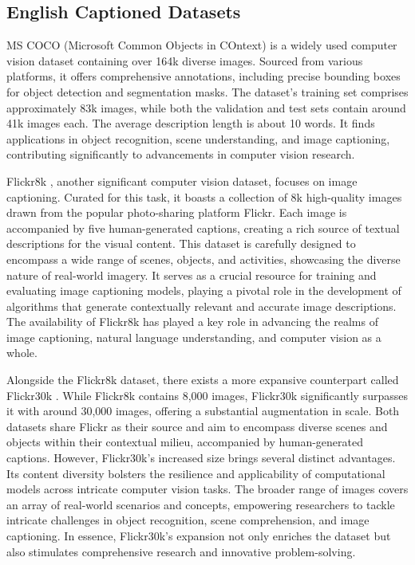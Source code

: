 \documentclass[lettersize,journal]{IEEEtran}
\begin{document}
\enlargethispage{-\baselineskip}

\subsection{English Captioned Datasets}
MS COCO (Microsoft Common Objects in COntext) \cite{MSCOCO} is a widely used computer vision dataset containing over 164k diverse images. Sourced from various platforms, it offers comprehensive annotations, including precise bounding boxes for object detection and segmentation masks. The dataset's training set comprises approximately 83k images, while both the validation and test sets contain around 41k images each. The average description length is about 10 words. It finds applications in object recognition, scene understanding, and image captioning, contributing significantly to advancements in computer vision research. 

Flickr8k \cite{Flickr8k}, another significant computer vision dataset, focuses on image captioning. Curated for this task, it boasts a collection of 8k high-quality images drawn from the popular photo-sharing platform Flickr. Each image is accompanied by five human-generated captions, creating a rich source of textual descriptions for the visual content. This dataset is carefully designed to encompass a wide range of scenes, objects, and activities, showcasing the diverse nature of real-world imagery. It serves as a crucial resource for training and evaluating image captioning models, playing a pivotal role in the development of algorithms that generate contextually relevant and accurate image descriptions. The availability of Flickr8k has played a key role in advancing the realms of image captioning, natural language understanding, and computer vision as a whole.

Alongside the Flickr8k dataset, there exists a more expansive counterpart called Flickr30k \cite{Flickr30k}. While Flickr8k contains 8,000 images, Flickr30k significantly surpasses it with around 30,000 images, offering a substantial augmentation in scale. Both datasets share Flickr as their source and aim to encompass diverse scenes and objects within their contextual milieu, accompanied by human-generated captions.
However, Flickr30k's increased size brings several distinct advantages. Its content diversity bolsters the resilience and applicability of computational models across intricate computer vision tasks. The broader range of images covers an array of real-world scenarios and concepts, empowering researchers to tackle intricate challenges in object recognition, scene comprehension, and image captioning. In essence, Flickr30k's expansion not only enriches the dataset but also stimulates comprehensive research and innovative problem-solving.
\end{document}
